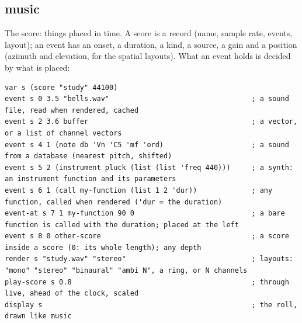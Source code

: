 \documentclass[11pt,a4paper]{article}
\begin{document}


\subsection{music}

The score: things placed in time. A score is a record (name, sample rate, events, layout);
an event has an onset, a duration, a kind, a source, a gain and a position (azimuth and
elevation, for the spatial layouts). What an event holds is decided by what is placed:

\begin{lstlisting}
var s (score "study" 44100)
event s 0 3.5 "bells.wav"                                  ; a sound file, read when rendered, cached
event s 2 3.6 buffer                                       ; a vector, or a list of channel vectors
event s 4 1 (note db 'Vn 'C5 'mf 'ord)                     ; a sound from a database (nearest pitch, shifted)
event s 5 2 (instrument pluck (list (list 'freq 440)))     ; a synth: an instrument function and its parameters
event s 6 1 (call my-function (list 1 2 'dur))             ; any function, called when rendered ('dur = the duration)
event-at s 7 1 my-function 90 0                            ; a bare function is called with the duration; placed at the left
event s 8 0 other-score                                    ; a score inside a score (0: its whole length); any depth
render s "study.wav" "stereo"                              ; layouts: "mono" "stereo" "binaural" "ambi N", a ring, or N channels
play-score s 0.8                                           ; through live, ahead of the clock, scaled
display s                                                  ; the roll, drawn like music
\end{lstlisting}
\end{document}
